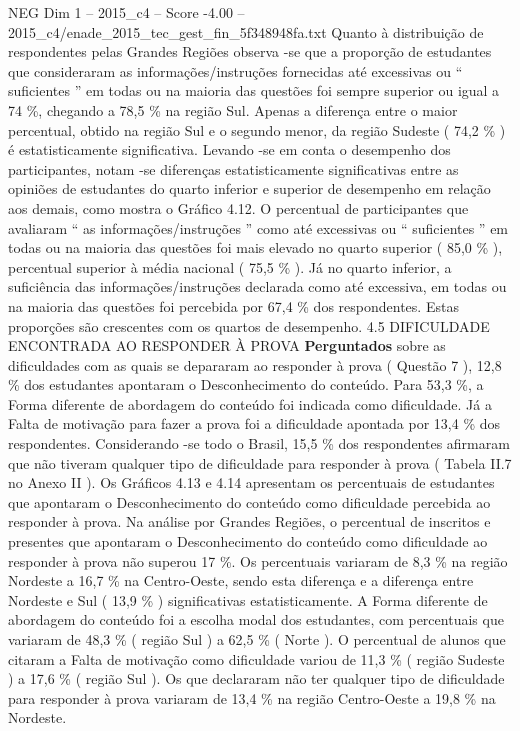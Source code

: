 \begin{textsample}{NEG Dim 1 – 2015\_c4 – Score -4.00 – 2015\_c4/enade\_2015\_tec\_gest\_fin\_5f348948fa.txt}
Quanto à distribuição de respondentes pelas Grandes Regiões observa -se que a proporção de estudantes que consideraram as informações/instruções fornecidas até excessivas ou “ suficientes ” em todas ou na maioria das questões foi sempre superior ou igual a 74 \%, chegando a 78,5 \% na região Sul.
Apenas a diferença entre o maior percentual, obtido na região Sul e o segundo menor, da região Sudeste ( 74,2 \% ) é estatisticamente significativa.
Levando -se em conta o desempenho dos participantes, notam -se diferenças estatisticamente significativas entre as opiniões de estudantes do quarto inferior e superior de desempenho em relação aos demais, como mostra o Gráfico 4.12.
O percentual de participantes que avaliaram “ as informações/instruções ” como até excessivas ou “ suficientes ” em todas ou na maioria das questões foi mais elevado no quarto superior ( 85,0 \% ), percentual superior à média nacional ( 75,5 \% ).
Já no quarto inferior, a suficiência das informações/instruções declarada como até excessiva, em todas ou na maioria das questões foi percebida por 67,4 \% dos respondentes.
Estas proporções são crescentes com os quartos de desempenho. 4.5 DIFICULDADE ENCONTRADA AO RESPONDER À PROVA \textbf{Perguntados} sobre as dificuldades com as quais se depararam ao responder à prova ( Questão 7 ), 12,8 \% dos estudantes apontaram o Desconhecimento do conteúdo.
Para 53,3 \%, a Forma diferente de abordagem do conteúdo foi indicada como dificuldade.
Já a Falta de motivação para fazer a prova foi a dificuldade apontada por 13,4 \% dos respondentes.
Considerando -se todo o Brasil, 15,5 \% dos respondentes afirmaram que não tiveram qualquer tipo de dificuldade para responder à prova ( Tabela II.7 no Anexo II ).
Os Gráficos 4.13 e 4.14 apresentam os percentuais de estudantes que apontaram o Desconhecimento do conteúdo como dificuldade percebida ao responder à prova.
Na análise por Grandes Regiões, o percentual de inscritos e presentes que apontaram o Desconhecimento do conteúdo como dificuldade ao responder à prova não superou 17 \%.
Os percentuais variaram de 8,3 \% na região Nordeste a 16,7 \% na Centro-Oeste, sendo esta diferença e a diferença entre Nordeste e Sul ( 13,9 \% ) significativas estatisticamente.
A Forma diferente de abordagem do conteúdo foi a escolha modal dos estudantes, com percentuais que variaram de 48,3 \% ( região Sul ) a 62,5 \% ( Norte ).
O percentual de alunos que citaram a Falta de motivação como dificuldade variou de 11,3 \% ( região Sudeste ) a 17,6 \% ( região Sul ).
Os que declararam não ter qualquer tipo de dificuldade para responder à prova variaram de 13,4 \% na região Centro-Oeste a 19,8 \% na Nordeste.

\end{textsample}
